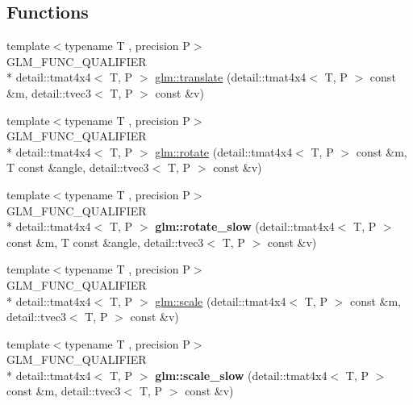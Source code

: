 \subsection*{Functions}
\begin{DoxyCompactItemize}
\item 
{\footnotesize template$<$typename T , precision P$>$ }\\G\-L\-M\-\_\-\-F\-U\-N\-C\-\_\-\-Q\-U\-A\-L\-I\-F\-I\-E\-R \\*
detail\-::tmat4x4$<$ T, P $>$ \hyperlink{group__gtc__matrix__transform_ga1501de0fa580dcc491b67e0685bbc7c2}{glm\-::translate} (detail\-::tmat4x4$<$ T, P $>$ const \&m, detail\-::tvec3$<$ T, P $>$ const \&v)
\item 
{\footnotesize template$<$typename T , precision P$>$ }\\G\-L\-M\-\_\-\-F\-U\-N\-C\-\_\-\-Q\-U\-A\-L\-I\-F\-I\-E\-R \\*
detail\-::tmat4x4$<$ T, P $>$ \hyperlink{group__gtc__matrix__transform_ga61e65a3bb227c267d1a15113d1056fb1}{glm\-::rotate} (detail\-::tmat4x4$<$ T, P $>$ const \&m, T const \&angle, detail\-::tvec3$<$ T, P $>$ const \&v)
\item 
\hypertarget{namespaceglm_a03bd2c89f62ae44ad3a5e5dc21effd06}{{\footnotesize template$<$typename T , precision P$>$ }\\G\-L\-M\-\_\-\-F\-U\-N\-C\-\_\-\-Q\-U\-A\-L\-I\-F\-I\-E\-R \\*
detail\-::tmat4x4$<$ T, P $>$ {\bfseries glm\-::rotate\-\_\-slow} (detail\-::tmat4x4$<$ T, P $>$ const \&m, T const \&angle, detail\-::tvec3$<$ T, P $>$ const \&v)}\label{namespaceglm_a03bd2c89f62ae44ad3a5e5dc21effd06}

\item 
{\footnotesize template$<$typename T , precision P$>$ }\\G\-L\-M\-\_\-\-F\-U\-N\-C\-\_\-\-Q\-U\-A\-L\-I\-F\-I\-E\-R \\*
detail\-::tmat4x4$<$ T, P $>$ \hyperlink{group__gtc__matrix__transform_gabd40959f269abd16c256a4f59ab03d62}{glm\-::scale} (detail\-::tmat4x4$<$ T, P $>$ const \&m, detail\-::tvec3$<$ T, P $>$ const \&v)
\item 
\hypertarget{namespaceglm_aa836cb5d035a8b96e5e9b4bb5dce0ab2}{{\footnotesize template$<$typename T , precision P$>$ }\\G\-L\-M\-\_\-\-F\-U\-N\-C\-\_\-\-Q\-U\-A\-L\-I\-F\-I\-E\-R \\*
detail\-::tmat4x4$<$ T, P $>$ {\bfseries glm\-::scale\-\_\-slow} (detail\-::tmat4x4$<$ T, P $>$ const \&m, detail\-::tvec3$<$ T, P $>$ const \&v)}\label{namespaceglm_aa836cb5d035a8b96e5e9b4bb5dce0ab2}


\end{DoxyCompactItemize}
